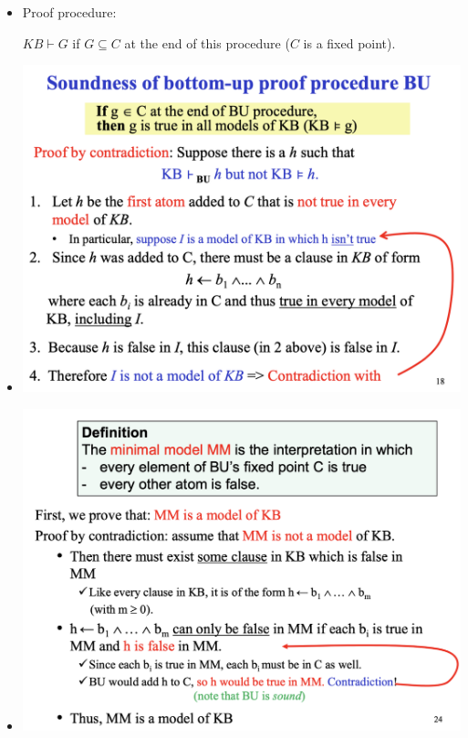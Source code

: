 \documentclass{article}
\begin{document}
\begin{itemize}
    \item Proof procedure:
    \begin{algorithmic}
        \Repeat
    \end{algorithmic}
    
    $KB \vdash G$ if $G \subseteq C$ at the end of this procedure ($C$ is a fixed point).
    \item 
    \includegraphics[scale=0.45]{soundness_of_bu}
    \item
    \includegraphics[scale=0.45]{completeness_of_bu}
\end{itemize}
\end{document}
